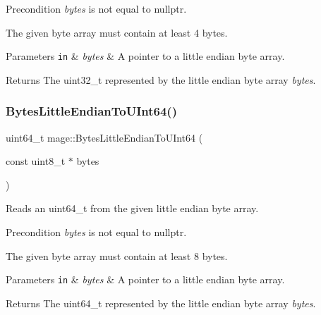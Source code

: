 \begin{DoxyPrecond}{Precondition}
{\itshape bytes} is not equal to {\ttfamily nullptr}. 

The given byte array must contain at least 4 bytes. 
\end{DoxyPrecond}

\begin{DoxyParams}[1]{Parameters}
\mbox{\tt in}  & {\em bytes} & A pointer to a little endian byte array. \\
\hline
\end{DoxyParams}
\begin{DoxyReturn}{Returns}
The {\ttfamily uint32\+\_\+t} represented by the little endian byte array {\itshape bytes}. 
\end{DoxyReturn}
\hypertarget{namespacemage_a5ad416b44d13c417c4cb17c2c6efdf1a}{}\label{namespacemage_a5ad416b44d13c417c4cb17c2c6efdf1a} 
\subsubsection{\texorpdfstring{Bytes\+Little\+Endian\+To\+U\+Int64()}{BytesLittleEndianToUInt64()}}
{\footnotesize\ttfamily uint64\+\_\+t mage\+::\+Bytes\+Little\+Endian\+To\+U\+Int64 (\begin{DoxyParamCaption}\item[{const uint8\+\_\+t $\ast$}]{bytes }\end{DoxyParamCaption})\hspace{0.3cm}{\ttfamily [noexcept]}}

Reads an uint64\+\_\+t from the given little endian byte array.

\begin{DoxyPrecond}{Precondition}
{\itshape bytes} is not equal to {\ttfamily nullptr}. 

The given byte array must contain at least 8 bytes. 
\end{DoxyPrecond}

\begin{DoxyParams}[1]{Parameters}
\mbox{\tt in}  & {\em bytes} & A pointer to a little endian byte array. \\
\hline
\end{DoxyParams}
\begin{DoxyReturn}{Returns}
The {\ttfamily uint64\+\_\+t} represented by the little endian byte array {\itshape bytes}. 
\end{DoxyReturn}
\hypertarget{namespacemage_a392a1bad181ddcc8c18b8ee988aa0f32}{}\label{namespacemage_a392a1bad181ddcc8c18b8ee988aa0f32} 

